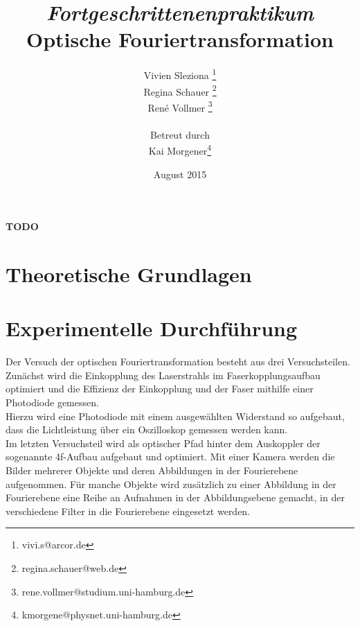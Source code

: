 \documentclass[12pt,a4paper]{article}
\begin{document}
	
	\textbf{TODO}
	
	
	
	\title{\textit{Fortgeschrittenenpraktikum}\\\textbf{Optische Fouriertransformation} }
	\date{August 2015}
	\author{Vivien Sleziona \footnote{vivi.s@arcor.de}\\ Regina Schauer \footnote{regina.schauer@web.de}\\ René Vollmer \footnote{rene.vollmer@studium.uni-hamburg.de} \\ \\Betreut durch\\ Kai Morgener\footnote{kmorgene@physnet.uni-hamburg.de}}
	
	\maketitle
	
	\begin{center} 
		\bigskip
		\bigskip
		
		\begin{minipage}{0.75\textwidth}
			
		\end{minipage}
	\end{center}
	
	\newpage
	
	\tableofcontents
	\vfill
	\newpage
	\clearpage	
	
	
	\section{Theoretische Grundlagen}
	
	

	
	\newpage
	\clearpage
	
	\section{Experimentelle Durchführung}
		Der Versuch der optischen Fouriertransformation besteht aus drei Versuchsteilen. Zunächst wird die Einkopplung des Laserstrahls im Faserkopplungsaufbau optimiert und die Effizienz der Einkopplung und der Faser mithilfe einer Photodiode gemessen. \\
		Hierzu wird eine Photodiode mit einem ausgewählten Widerstand so aufgebaut, dass die Lichtleistung über ein Oszilloskop gemessen werden kann.\\
		Im letzten Versuchsteil wird als optischer Pfad hinter dem Auskoppler der sogenannte 4f-Aufbau aufgebaut und optimiert. Mit einer Kamera werden die Bilder mehrerer Objekte und deren Abbildungen in der Fourierebene aufgenommen. Für manche Objekte wird zusätzlich zu einer Abbildung in der Fourierebene eine Reihe an Aufnahmen in der Abbildungsebene gemacht, in der verschiedene Filter in die Fourierebene eingesetzt werden.   
		
\end{document}
